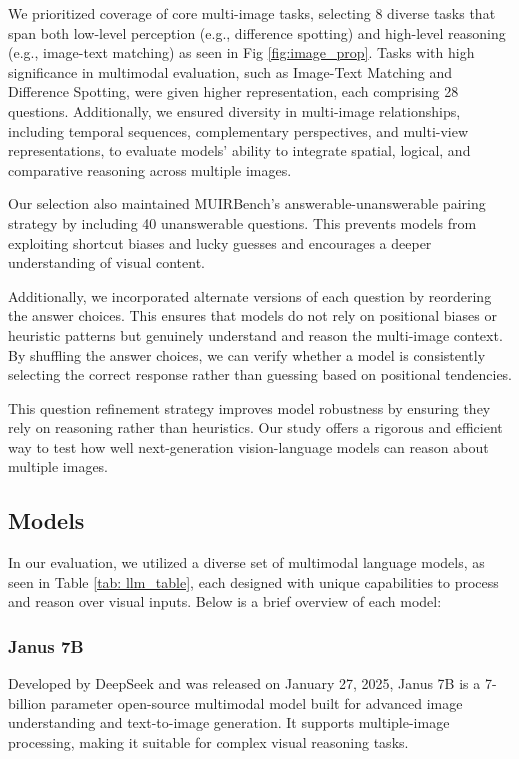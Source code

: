 We prioritized coverage of core multi-image tasks, selecting 8 diverse tasks that span both low-level perception (e.g., difference spotting) and high-level reasoning (e.g., image-text matching) as seen in Fig \ref{fig:image_prop}. Tasks with high significance in multimodal evaluation, such as Image-Text Matching and Difference Spotting, were given higher representation, each comprising 28 questions. Additionally, we ensured diversity in multi-image relationships, including temporal sequences, complementary perspectives, and multi-view representations, to evaluate models' ability to integrate spatial, logical, and comparative reasoning across multiple images.

Our selection also maintained MUIRBench’s answerable-unanswerable pairing strategy by including 40 unanswerable questions. This prevents models from exploiting shortcut biases and lucky guesses and encourages a deeper understanding of visual content. 

Additionally, we incorporated alternate versions of each question by reordering the answer choices. This ensures that models do not rely on positional biases or heuristic patterns but genuinely understand and reason the multi-image context. By shuffling the answer choices, we can verify whether a model is consistently selecting the correct response rather than guessing based on positional tendencies. 

This question refinement strategy improves model robustness by ensuring they rely on reasoning rather than heuristics. Our study offers a rigorous and efficient way to test how well next-generation vision-language models can reason about multiple images.

\subsection{Models}

In our evaluation, we utilized a diverse set of multimodal language models, as seen in Table \ref{tab: llm_table}, each designed with unique capabilities to process and reason over visual inputs. Below is a brief overview of each model: 

\subsubsection{Janus 7B} 
Developed by DeepSeek and was released on January 27, 2025, Janus 7B \cite{chen2025janus} is a 7-billion parameter open-source multimodal model built for advanced image understanding and text-to-image generation. It supports multiple-image processing, making it suitable for complex visual reasoning tasks.

